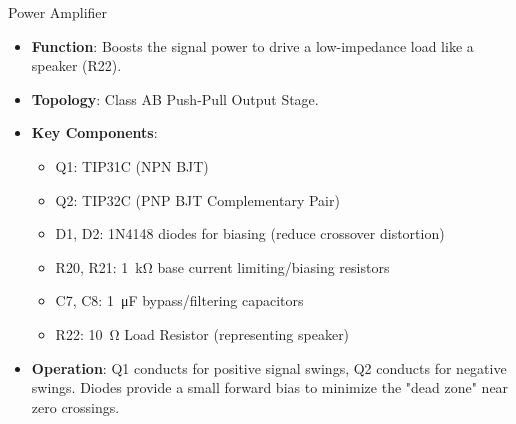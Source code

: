 \documentclass[10pt,xcolor={table,dvipsnames},t]{beamer}
\begin{document}
\begin{frame}{Power Amplifier}
\begin{itemize}
    \item \textbf{Function}: Boosts the signal power to drive a low-impedance load like a speaker (R22).
    \item \textbf{Topology}: Class AB Push-Pull Output Stage.
    \item \textbf{Key Components}:
    \begin{itemize}
        \item Q1: TIP31C (NPN BJT)
        \item Q2: TIP32C (PNP BJT Complementary Pair)
        \item D1, D2: 1N4148 diodes for biasing (reduce crossover distortion)
        \item R20, R21: \SI{1}{\kilo\ohm} base current limiting/biasing resistors
        \item C7, C8: \SI{1}{\micro\farad} bypass/filtering capacitors
        \item R22: \SI{10}{\ohm} Load Resistor (representing speaker)
    \end{itemize}
    \item \textbf{Operation}: Q1 conducts for positive signal swings, Q2 conducts for negative swings. Diodes provide a small forward bias to minimize the "dead zone" near zero crossings.
\end{itemize}
\end{frame}
\end{document}
